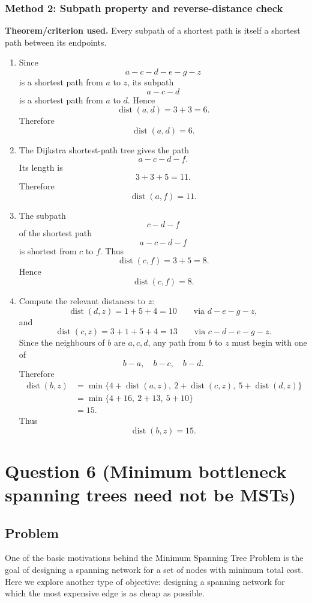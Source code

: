 \documentclass[12pt]{article}
\DeclareMathOperator{\dist}{dist}
\begin{document}
\subsubsection{Method 2: Subpath property and reverse-distance check}
\textbf{Theorem/criterion used.} Every subpath of a shortest path is itself a shortest path between its endpoints.

\begin{enumerate}[label=(\alph*)]
  \item Since
  \[
    a-c-d-e-g-z
  \]
  is a shortest path from $a$ to $z$, its subpath
  \[
    a-c-d
  \]
  is a shortest path from $a$ to $d$. Hence
  \[
    \dist(a,d)=3+3=6.
  \]
  Therefore
  \[
    \boxed{\dist(a,d)=6.}
  \]

  \item The Dijkstra shortest-path tree gives the path
  \[
    a-c-d-f.
  \]
  Its length is
  \[
    3+3+5=11.
  \]
  Therefore
  \[
    \boxed{\dist(a,f)=11.}
  \]

  \item The subpath
  \[
    c-d-f
  \]
  of the shortest path
  \[
    a-c-d-f
  \]
  is shortest from $c$ to $f$. Thus
  \[
    \dist(c,f)=3+5=8.
  \]
  Hence
  \[
    \boxed{\dist(c,f)=8.}
  \]

  \item Compute the relevant distances to $z$:
  \[
    \dist(d,z)=1+5+4=10
    \qquad\text{via }d-e-g-z,
  \]
  and
  \[
    \dist(c,z)=3+1+5+4=13
    \qquad\text{via }c-d-e-g-z.
  \]
  Since the neighbours of $b$ are $a,c,d$, any path from $b$ to $z$ must begin with one of
  \[
    b-a,\quad b-c,\quad b-d.
  \]
  Therefore
  \[
  \begin{aligned}
    \dist(b,z)
    &=\min\{4+\dist(a,z),\ 2+\dist(c,z),\ 5+\dist(d,z)\}\\
    &=\min\{4+16,\ 2+13,\ 5+10\}\\
    &=15.
  \end{aligned}
  \]
  Thus
  \[
    \boxed{\dist(b,z)=15.}
  \]
\end{enumerate}

\newpage
\section{Question 6 (Minimum bottleneck spanning trees need not be MSTs)}

\subsection{Problem}
One of the basic motivations behind the Minimum Spanning Tree Problem is the goal of designing a spanning network for a set of nodes with minimum total cost. Here we explore another type of objective: designing a spanning network for which the most expensive edge is as cheap as possible.
\end{document}
